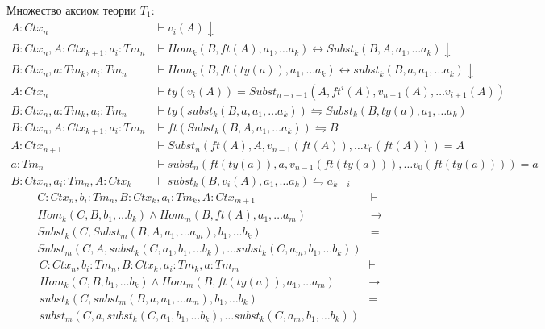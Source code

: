 \documentclass{amsart}
\theoremstyle{definition}
\theoremstyle{remark}
\numberwithin{figure}{section}
\begin{document}
Множество аксиом теории $T_1$:
\begin{align*}
A : Ctx_n & \vdash v_i(A) \downarrow \\
B : Ctx_n, A : Ctx_{k+1}, a_i : Tm_n & \vdash Hom_k(B, ft(A), a_1, \ldots a_k) \leftrightarrow Subst_k(B, A, a_1, \ldots a_k) \downarrow \\
B : Ctx_n, a : Tm_k, a_i : Tm_n & \vdash Hom_k(B, ft(ty(a)), a_1, \ldots a_k) \leftrightarrow subst_k(B, a, a_1, \ldots a_k) \downarrow \\
A : Ctx_n & \vdash ty(v_i(A)) = Subst_{n-i-1}(A, ft^i(A), v_{n-1}(A), \ldots v_{i+1}(A)) \\
B : Ctx_n, a : Tm_k, a_i : Tm_n & \vdash ty(subst_k(B, a, a_1, \ldots a_k)) \leftrightharpoons Subst_k(B, ty(a), a_1, \ldots a_k) \\
B : Ctx_n, A : Ctx_{k+1}, a_i : Tm_n & \vdash ft(Subst_k(B, A, a_1, \ldots a_k)) \leftrightharpoons B \\
A : Ctx_{n+1} & \vdash Subst_n(ft(A), A, v_{n-1}(ft(A)), \ldots v_0(ft(A))) = A \\
a : Tm_n & \vdash subst_n(ft(ty(a)), a, v_{n-1}(ft(ty(a))), \ldots v_0(ft(ty(a)))) = a \\
B : Ctx_n, a_i : Tm_n, A : Ctx_k & \vdash subst_k(B, v_i(A), a_1, \ldots a_k) \leftrightharpoons a_{k-i}
\end{align*}
\begin{align*}
C : Ctx_n, b_i : Tm_n, B : Ctx_k, a_i : Tm_k, A : Ctx_{m+1} & \vdash \\
    Hom_k(C, B, b_1, \ldots b_k) \land Hom_m(B, ft(A), a_1, \ldots a_m) & \to \\
    Subst_k(C, Subst_m(B, A, a_1, \ldots a_m), b_1, \ldots b_k) & = \\
    Subst_m(C, A, subst_k(C, a_1, b_1, \ldots b_k), \ldots subst_k(C, a_m, b_1, \ldots b_k))
\end{align*}
\begin{align*}
C : Ctx_n, b_i : Tm_n, B : Ctx_k, a_i : Tm_k, a : Tm_m & \vdash \\
    Hom_k(C, B, b_1, \ldots b_k) \land Hom_m(B, ft(ty(a)), a_1, \ldots a_m) & \to \\
    subst_k(C, subst_m(B, a, a_1, \ldots a_m), b_1, \ldots b_k) & = \\
    subst_m(C, a, subst_k(C, a_1, b_1, \ldots b_k), \ldots subst_k(C, a_m, b_1, \ldots b_k))
\end{align*}
\end{document}
